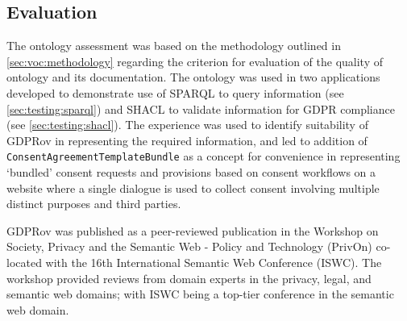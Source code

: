 \subsection{Evaluation}\label{sec:voc:gdprov:evaluation}
The ontology assessment was based on the methodology outlined in \autoref{sec:voc:methodology} regarding the criterion for evaluation of the quality of ontology and its documentation.
The ontology was used in two applications developed to demonstrate use of SPARQL to query information (see \autoref{sec:testing:sparql}) and SHACL to validate information for GDPR compliance (see \autoref{sec:testing:shacl}). The experience was used to identify suitability of GDPRov in representing the required information, and led to addition of \texttt{ConsentAgreementTemplateBundle} as a concept for convenience in representing `bundled' consent requests and provisions based on consent workflows on a website where a single dialogue is used to collect consent involving multiple distinct purposes and third parties.

GDPRov was published \cite{pandit_modelling_2017} as a peer-reviewed publication in the Workshop on Society, Privacy and the Semantic Web - Policy and Technology (PrivOn) co-located with the 16th International Semantic Web Conference (ISWC). The workshop provided reviews from domain experts in the privacy, legal, and semantic web domains; with ISWC being a top-tier conference in the semantic web domain.

